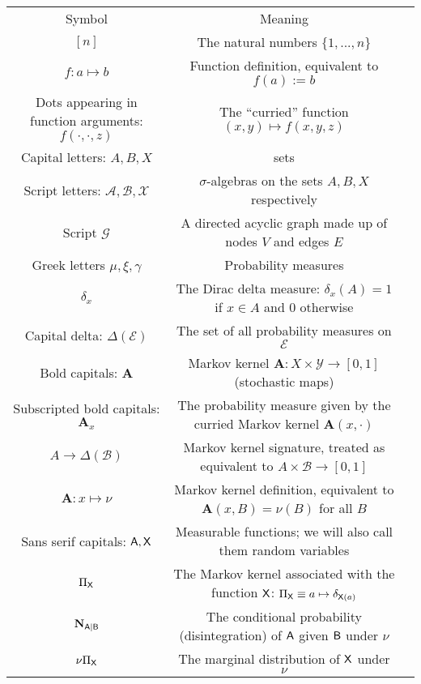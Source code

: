 \begin{center}
\begin{tabular}{ |c|c|c| } 
 \hline
 Symbol & Meaning \\ 
 $[n]$& The natural numbers $\{1,...,n\}$ \\ 
 $f:a\mapsto b$ & Function definition, equivalent to $f(a):=b$\\
 Dots appearing in function arguments: $f(\cdot,\cdot,z)$ & The ``curried'' function $(x, y )\mapsto f(x,y,z)$\\
 Capital letters: $A,B, X$ & sets \\ 
 Script letters: $\mathcal{A},\mathcal{B},\mathcal{X}$ & $\sigma$-algebras on the sets $A, B, X$ respectively\\
 Script $\mathcal{G}$ & A directed acyclic graph made up of nodes $V$ and edges $E$\\
 Greek letters $\mu, \xi, \gamma$ & Probability measures\\
 $\delta_x$ & The Dirac delta measure: $\delta_x(A) = 1$ if $x\in A$ and $0$ otherwise\\
 Capital delta: $\Delta(\mathcal{E})$ & The set of all probability measures on $\mathcal{E}$\\
 Bold capitals: $\mathbf{A}$ & Markov kernel $\mathbf{A}:X\times\mathcal{Y}\to [0,1]$ (stochastic maps)\\
 Subscripted bold capitals: $\mathbf{A}_x$ & The probability measure given by the curried Markov kernel $\mathbf{A}(x,\cdot)$\\
 $A\to\Delta(\mathcal{B})$ & Markov kernel signature, treated as equivalent to $A\times \mathcal{B}\to [0,1]$\\
 $\mathbf{A}:x\mapsto \nu$ & Markov kernel definition, equivalent to $\mathbf{A}(x,B) = \nu(B)$ for all $B$\\
 Sans serif capitals: $\mathsf{A},\mathsf{X}$ & Measurable functions; we will also call them random variables\\
 $\Pi_{\mathsf{X}}$ & The Markov kernel associated with the function $\mathsf{X}$: $\Pi_{\mathsf{X}} \equiv a\mapsto \delta_{\mathsf{X}(a)}$\\
 $\mathbf{N}_{\mathsf{A}|\mathsf{B}}$ & The conditional probability (disintegration) of $\mathsf{A}$ given $\mathsf{B}$ under $\nu$\\
 $\nu \Pi_{\mathsf{X}}$ & The marginal distribution of $\mathsf{X}$ under $\nu$\\
 \hline
\end{tabular}
\end{center}

